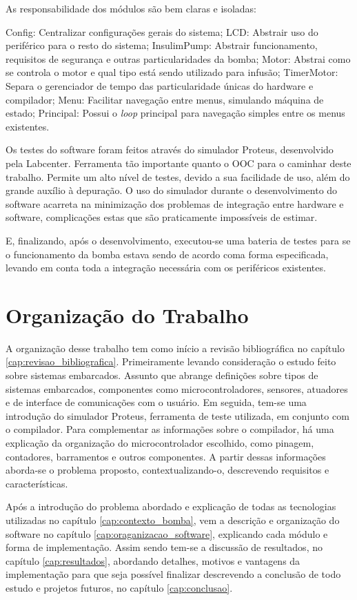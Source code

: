 As responsabilidade dos módulos são bem claras e isoladas:

Config: Centralizar configurações gerais do sistema;
LCD: Abstrair uso do periférico para o resto do sistema;
InsulimPump: Abstrair funcionamento, requisitos de segurança e outras particularidades da bomba;
Motor: Abstrai como se controla o motor e qual tipo está sendo utilizado para infusão;
TimerMotor: Separa o gerenciador de tempo das particularidade únicas do hardware e compilador;
Menu: Facilitar navegação entre menus, simulando máquina de estado;
Principal: Possui o \emph{loop} principal para navegação simples entre os menus existentes.

Os testes do software foram feitos através do simulador Proteus, desenvolvido pela Labcenter. Ferramenta tão importante quanto o OOC para o caminhar deste trabalho. Permite um alto nível de testes, devido a sua facilidade de uso, além do grande auxílio à depuração. O uso do simulador durante o desenvolvimento do software acarreta na minimização dos problemas de integração entre hardware e software, complicações estas que são praticamente impossíveis de estimar. 

E, finalizando, após o desenvolvimento, executou-se uma bateria de testes para se o funcionamento da bomba estava sendo de acordo coma forma especificada, levando em conta toda a integração necessária com os periféricos existentes.

\section{Organização do Trabalho}

A organização desse trabalho tem como início a revisão bibliográfica no capítulo \ref{cap:revisao_bibliografica}. Primeiramente levando consideração o estudo feito sobre sistemas embarcados. Assunto que abrange definições sobre tipos de sistemas embarcados, componentes como microcontroladores, sensores, atuadores e de interface de comunicações com o usuário. Em seguida, tem-se uma introdução do simulador Proteus, ferramenta de teste utilizada, em conjunto com o compilador. Para complementar as informações sobre o compilador, há uma explicação da organização do microcontrolador escolhido, como pinagem, contadores, barramentos e outros componentes. A partir dessas informações aborda-se o problema proposto, contextualizando-o, descrevendo requisitos e características. 

Após a introdução do problema abordado e explicação de todas as tecnologias utilizadas no capítulo \ref{cap:contexto_bomba}, vem a descrição e organização do software no capítulo \ref{cap:oraganizacao_software}, explicando cada módulo e forma de implementação. Assim sendo tem-se a discussão de resultados, no capítulo \ref{cap:resultados}, abordando detalhes, motivos e vantagens da implementação para que seja possível finalizar descrevendo a conclusão de todo estudo e projetos futuros, no capítulo \ref{cap:conclusao}.
